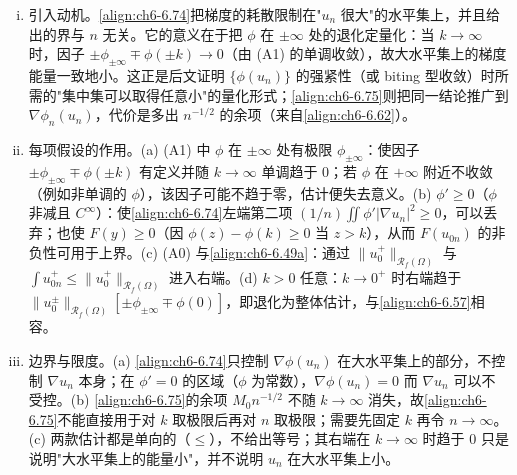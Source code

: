 \documentclass[../../main.tex]{subfiles}%
\begin{document}
\begin{remark}\label{remark:ch06-6.5.8动机}
\begin{enumerate}[(i)]
\item 引入动机。\eqref{align:ch6-6.74}把梯度的耗散限制在"$u_n$ 很大"的水平集上，并且给出的界与 $n$ 无关。它的意义在于把 $\phi$ 在 $\pm\infty$ 处的退化定量化：当 $k\to\infty$ 时，因子 $\pm\phi_{\pm\infty}\mp\phi(\pm k)\to0$（由 (A1) 的单调收敛），故大水平集上的梯度能量一致地小。这正是后文证明 $\{\phi(u_n)\}$ 的强紧性（或 biting 型收敛）时所需的"集中集可以取得任意小"的量化形式；\eqref{align:ch6-6.75}则把同一结论推广到 $\nabla\phi_n(u_n)$，代价是多出 $n^{-1/2}$ 的余项（来自\eqref{align:ch6-6.62}）。
\item 每项假设的作用。(a) (A1) 中 $\phi$ 在 $\pm\infty$ 处有极限 $\phi_{\pm\infty}$：使因子 $\pm\phi_{\pm\infty}\mp\phi(\pm k)$ 有定义并随 $k\to\infty$ 单调趋于 $0$；若 $\phi$ 在 $+\infty$ 附近不收敛（例如非单调的 $\phi$），该因子可能不趋于零，估计便失去意义。(b) $\phi'\geqslant0$（$\phi$ 非减且 $C^\infty$）：使\eqref{align:ch6-6.74}左端第二项 $(1/n)\iint\phi'|\nabla u_n|^2\geqslant0$，可以丢弃；也使 $F(y)\geqslant0$（因 $\phi(z)-\phi(k)\geqslant0$ 当 $z>k$），从而 $F(u_{0n})$ 的非负性可用于上界。(c) (A0) 与\eqref{align:ch6-6.49a}：通过 $\|u^+_0\|_{\mathscr{R}_f(\Omega)}$ 与 $\int u^+_{0n}\leqslant\|u^+_0\|_{\mathscr{R}_f(\Omega)}$ 进入右端。(d) $k>0$ 任意：$k\to0^+$ 时右端趋于 $\|u^\pm_0\|_{\mathscr{R}_f(\Omega)}[\pm\phi_{\pm\infty}\mp\phi(0)]$，即退化为整体估计，与\eqref{align:ch6-6.57}相容。
\item 边界与限度。(a) \eqref{align:ch6-6.74}只控制 $\nabla\phi(u_n)$ 在大水平集上的部分，不控制 $\nabla u_n$ 本身；在 $\phi'=0$ 的区域（$\phi$ 为常数），$\nabla\phi(u_n)=0$ 而 $\nabla u_n$ 可以不受控。(b) \eqref{align:ch6-6.75}的余项 $M_0n^{-1/2}$ 不随 $k\to\infty$ 消失，故\eqref{align:ch6-6.75}不能直接用于对 $k$ 取极限后再对 $n$ 取极限；需要先固定 $k$ 再令 $n\to\infty$。(c) 两款估计都是单向的（$\leqslant$），不给出等号；其右端在 $k\to\infty$ 时趋于 $0$ 只是说明"大水平集上的能量小"，并不说明 $u_n$ 在大水平集上小。
\end{enumerate}
\end{remark}
\end{document}
